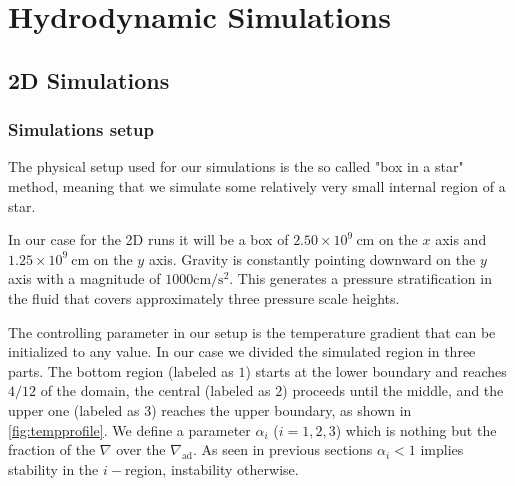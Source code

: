 
\chapter{Hydrodynamic Simulations}
\section{2D Simulations}
\subsection{Simulations setup}
The physical setup used for our simulations is the so called "box in a star" method, meaning that we simulate some relatively very small internal region of a star. 

In our case for the 2D runs it will be a box of $2.50 \times 10^{9} \ \mathrm{cm}$ on the $x$ axis and $1.25 \times 10^{9} \ \mathrm{cm}$ on the $y$ axis. Gravity is constantly pointing downward on the $y$ axis with a magnitude of $1000 \mathrm{cm/s^2}$. This generates a pressure stratification in the fluid that covers approximately three pressure scale heights. 

The controlling parameter in our setup is the temperature gradient that can be initialized to any value. In our case we divided the simulated region in three parts. The bottom region (labeled as $1$) starts at the lower boundary and reaches $4/12$ of the domain, the central (labeled as $2$) proceeds until the middle, and the upper one (labeled as $3$) reaches the upper boundary, as shown in \ref{fig:tempprofile}. We define a parameter $\alpha_{i}$ ($i=1, 2, 3$) which is nothing but the fraction of the $\nabla$ over the $\nabla_{\mathrm{ad}}$. As seen in previous sections $\alpha_{i}<1$ implies stability in the $i-$region, instability otherwise. 

